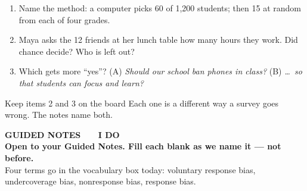 \documentclass[aspectratio=169, 11pt]{beamer}
\begin{document}
\begin{frame}[t, plain]
  \begin{enumerate}\setlength{\itemsep}{8pt}
    \item Name the method: a computer picks 60 of 1{,}200 students; then 15 at random from each
          of four grades.
    \item Maya asks the 12 friends at her lunch table how many hours they work. Did chance
          decide? Who is left out?
    \item Which gets more ``yes''? (A) \emph{Should our school ban phones in class?} \quad
          (B) \emph{\ldots\ so that students can focus and learn?}
  \end{enumerate}
  \vspace{6pt}
  \begin{block}{Keep items 2 and 3 on the board}
    Each one is a different way a survey goes wrong. The notes name both.
  \end{block}
\end{frame}

{
\begin{frame}[plain]
  \vspace{1.8cm}\hspace{0.8cm}%
  \begin{minipage}{0.86\textwidth}
    {\color{goldacc}\bfseries\small GUIDED NOTES \ \textbullet\ \ I DO}\\[0.7cm]
    {\color{white}\bfseries\Large Open to your Guided Notes. Fill each blank as we name it
    --- not before.}\\[0.9cm]
    {\color{skymid}\small Four terms go in the vocabulary box today: voluntary response bias,
    undercoverage bias, nonresponse bias, response bias.}
  \end{minipage}
\end{frame}
}
\end{document}

